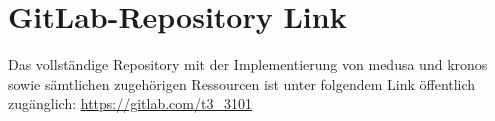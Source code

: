 \section{GitLab-Repository Link}\label{sec:gitlab-repository-link}
    Das vollständige Repository mit der Implementierung von \ac{medusa} und \ac{kronos} sowie sämtlichen zugehörigen Ressourcen ist unter folgendem Link öffentlich zugänglich: \url{https://gitlab.com/t3_3101}
